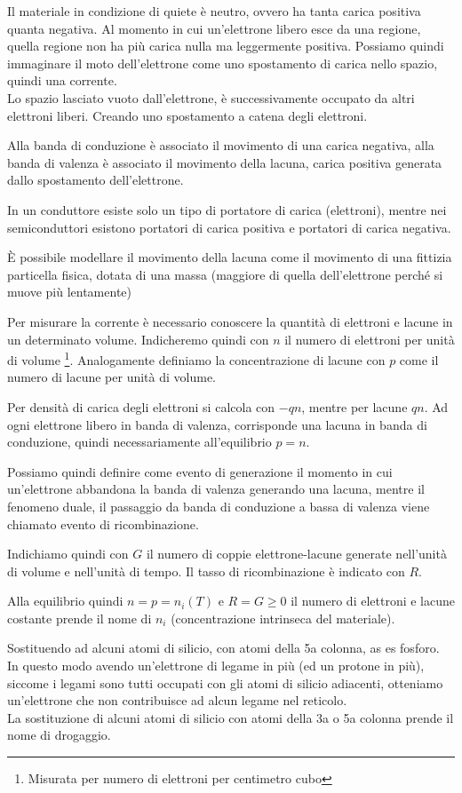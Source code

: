 \documentclass[../template]{subfiles}
\begin{document}
Il materiale in condizione di quiete è neutro, ovvero ha tanta carica positiva quanta negativa. Al momento in cui un'elettrone libero esce da una regione, quella regione non ha più carica nulla ma leggermente positiva. Possiamo quindi immaginare il moto dell'elettrone come uno spostamento di carica nello spazio, quindi una corrente.
\\
Lo spazio lasciato vuoto dall'elettrone, è successivamente occupato da altri elettroni liberi. Creando uno spostamento a catena degli elettroni.

Alla banda di conduzione è associato il movimento di una carica negativa, alla banda di valenza è associato il movimento della lacuna, carica positiva generata dallo spostamento dell'elettrone.

In un conduttore esiste solo un tipo di portatore di carica (elettroni), mentre nei semiconduttori esistono portatori di carica positiva e portatori di carica negativa.

È possibile modellare il movimento della lacuna come il movimento di una fittizia particella fisica, dotata di una massa (maggiore di quella dell'elettrone perché si muove più lentamente)

Per misurare la corrente è necessario conoscere la quantità di elettroni e lacune in un determinato volume.
Indicheremo quindi con $n$ il numero di elettroni per unità di volume \footnote{Misurata per numero di elettroni per centimetro cubo}.
Analogamente definiamo la concentrazione di lacune con $p$ come il numero di lacune per unità di volume.

Per densità di carica degli elettroni si calcola con $-qn$, mentre per lacune $qn$.
Ad ogni elettrone libero in banda di valenza, corrisponde una lacuna in banda di conduzione, quindi necessariamente all'equilibrio $p = n$.

Possiamo quindi definire come evento di generazione il momento in cui un'elettrone abbandona la banda di valenza generando una lacuna, mentre il fenomeno duale, il passaggio da banda di conduzione a bassa di valenza viene chiamato evento di ricombinazione.

Indichiamo quindi con $G$ il numero di coppie elettrone-lacune generate nell'unità di volume e nell'unità di tempo. Il tasso di ricombinazione è indicato con $R$.

Alla equilibrio quindi $n = p = n_i(T)$ e $R = G\ge 0$ il numero di elettroni e lacune costante prende il nome di $n_i$ (concentrazione intrinseca del materiale).

Sostituendo ad alcuni atomi di silicio, con atomi della 5a colonna, as es fosforo. In questo modo avendo un'elettrone di legame in più (ed un protone in più), siccome i legami sono tutti occupati con gli atomi di silicio adiacenti, otteniamo un'elettrone che non contribuisce ad alcun legame nel reticolo.
\\
La sostituzione di alcuni atomi di silicio con atomi della 3a o 5a colonna prende il nome di drogaggio.
\end{document}

